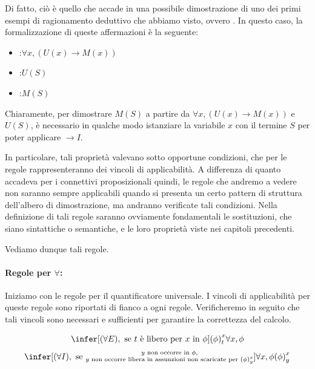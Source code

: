 Di fatto, ciò è quello che accade in una possibile dimostrazione di uno dei primi esempi di ragionamento deduttivo che abbiamo visto, ovvero . In questo caso, la formalizzazione di queste affermazioni è la seguente:
\begin{itemize}
  \item {}:\(\forall x, (U(x)\to M(x))\)
  \item {}:\( U(S)\)
  \item {}:\(M(S)\)
\end{itemize}

Chiaramente, per dimostrare \(M(S)\) a partire da \(\forall x, (U(x)\to M(x))\) e \(U(S)\), è necessario in qualche modo istanziare la variabile \(x\) con il termine \(S\) per poter applicare \(\to I\).

In particolare, tali proprietà valevano sotto opportune condizioni, che per le regole rappresenteranno dei vincoli di applicabilità. A differenza di quanto accadeva per i connettivi proposizionali quindi, le regole che andremo a vedere non saranno sempre applicabili quando si presenta un certo pattern di struttura dell'albero di dimostrazione, ma andranno verificate tali condizioni.
Nella definizione di tali regole saranno ovviamente fondamentali le sostituzioni, che siano sintattiche o semantiche, e le loro proprietà viste nei capitoli precedenti. 

Vediamo dunque tali regole.

\paragraph{Regole per \(\forall\):}

Iniziamo con le regole per il quantificatore universale. I vincoli di applicabilità per queste regole sono riportati di fianco a ogni regole. Verificheremo in seguito che tali vincoli sono necessari e sufficienti per garantire la correttezza del calcolo.

\begin{equation*}
  \infer[(\forall E), \text{ se } t \text{ è libero per } x \text{ in } \phi]{\subs{\phi}{x}{t}}{\forall x, \phi}
\end{equation*}
\begin{equation*}
  \infer[(\forall I), \text{ se } \substack{ y \text{ non occorre in } \phi, \\ y \text{ non occorre libera in assunzioni non scaricate per } {\subs{\phi}{x}{y}}}]{\forall x, \phi}{\subs{\phi}{x}{y}}
\end{equation*}


